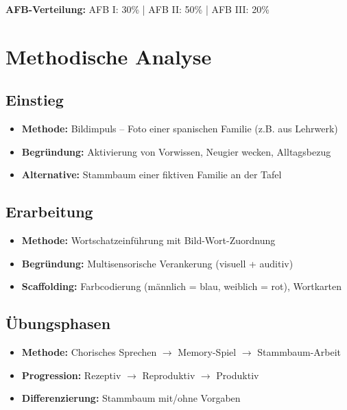 \documentclass[11pt,a4paper]{article}
\begin{document}
\vspace{1em}
\textbf{AFB-Verteilung:} AFB I: 30\% | AFB II: 50\% | AFB III: 20\%

\section{Methodische Analyse}

\subsection{Einstieg}
\begin{itemize}
    \item \textbf{Methode:} Bildimpuls -- Foto einer spanischen Familie (z.B. aus Lehrwerk)
    \item \textbf{Begründung:} Aktivierung von Vorwissen, Neugier wecken, Alltagsbezug
    \item \textbf{Alternative:} Stammbaum einer fiktiven Familie an der Tafel
\end{itemize}

\subsection{Erarbeitung}
\begin{itemize}
    \item \textbf{Methode:} Wortschatzeinführung mit Bild-Wort-Zuordnung
    \item \textbf{Begründung:} Multisensorische Verankerung (visuell + auditiv)
    \item \textbf{Scaffolding:} Farbcodierung (männlich = blau, weiblich = rot), Wortkarten
\end{itemize}

\subsection{Übungsphasen}
\begin{itemize}
    \item \textbf{Methode:} Chorisches Sprechen $\rightarrow$ Memory-Spiel $\rightarrow$ Stammbaum-Arbeit
    \item \textbf{Progression:} Rezeptiv $\rightarrow$ Reproduktiv $\rightarrow$ Produktiv
    \item \textbf{Differenzierung:} Stammbaum mit/ohne Vorgaben
\end{itemize}
\end{document}
